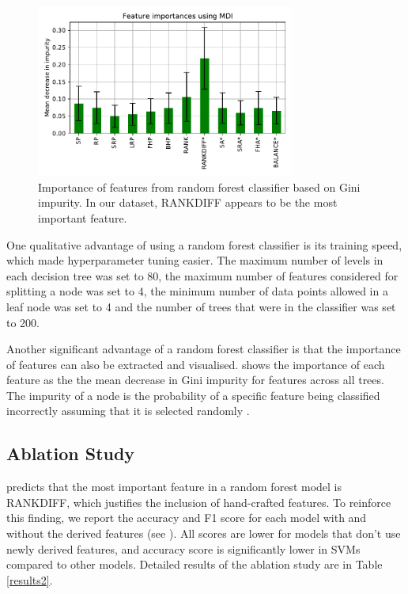 

\begin{figure}[ht]

\includegraphics[width=8.5cm]{plots/feature_importance.pdf}
\caption{Importance of features from random forest classifier based on Gini impurity. In our dataset, RANKDIFF appears to be the most important feature.}

\label{fig:fig4}
\centering
\end{figure}

One qualitative advantage of using a random forest classifier is its training speed, which made hyperparameter tuning easier. The maximum number of levels in each decision tree was set to 80, the maximum number of features considered for splitting a node was set to 4, the minimum number of data points allowed in a leaf node was set to 4 and the number of trees that were in the classifier was set to 200.

Another significant advantage of a random forest classifier is that the importance of features can also be extracted and visualised.   shows the importance of each feature as the the mean decrease in Gini impurity for features across all trees. The impurity of a node is the probability of a specific feature being classified incorrectly assuming that it is selected randomly \cite{cassidy2014calculating}.


\subsection{Ablation Study}
 predicts that the most important feature in a random forest model is  RANKDIFF, which justifies the inclusion of hand-crafted features. To reinforce this finding, we report the accuracy and F1 score for each model with and without the derived features (see ). All scores are lower for models that don't use newly derived features, and accuracy score is significantly lower in SVMs compared to other models. Detailed results of the ablation study are  in Table \ref{results2}.

